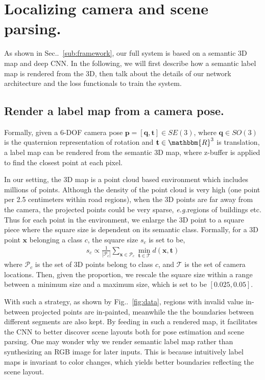 \documentclass[10pt,twocolumn,letterpaper]{article}
\makeatletter
\newcommand{\figref}[1]{Fig\onedot~\ref{#1}}
\newcommand{\secref}[1]{Sec\onedot~\ref{#1}}
\newcommand{\ve}[1]{{\mathbf #1}} %
\newcommand{\hua}[1]{{\mathcal #1}}
\DeclareRobustCommand\onedot{\futurelet\@let@token\@onedot}
\def\onedot{\ifx\@let@token.\else.\null\fi\xspace}
\def\eg{\emph{e.g.}}
\makeatother
\begin{document}
\section{Localizing camera and scene parsing.}
\label{sec:localize_and_parsing}
As shown in \secref{sub:framework}, our full system is based on a semantic 3D map and deep CNN. In the following, we will first describe how a semantic label map is rendered from the 3D, then talk about the details of our network architecture and the loss functionals to train the system.

\subsection{Render a label map from a camera pose.} 
\label{sub:render}
Formally, given a 6-DOF camera pose $\ve{p} = [\ve{q}, \ve{t}] \in SE(3)$, where $\ve{q} \in SO(3)$ is the quaternion representation of rotation and $\ve{t} \in \mathbbm{R}^3$ is translation, a label map can be rendered from the semantic 3D map, where z-buffer is applied to find the closest point at each pixel.

In our setting, the 3D map is a point cloud based environment which includes millions of points. Although the density of the point cloud is very high (one point per 2.5 centimeters within road regions), when the 3D points are far away from the camera, the projected points could be very sparse, \eg regions of buildings etc.
Thus for each point in the environment, we enlarge the 3D point to a square piece where the square size is dependent on its semantic class. Formally, for a 3D point $\ve{x}$ belonging a class $c$, the square size $s_c$ is set to be,
\begin{align}
\label{eq:square_size}
s_c \propto \frac{1}{|\hua{P}_c|}\sum_{\ve{x}\in \hua{P}_c} \min_{\ve{t}\in\hua{T}} d(\ve{x}, \ve{t})
\end{align}
where $\hua{P}_c$ is the set of 3D points belong to class $c$, and $\hua{T}$ is the set of camera locations. Then, given the proportion, we rescale the square size within a range between a minimum size and a maximum size, which is set to be $[0.025, 0.05]$.

With such a strategy, as shown by \figref{fig:data}, regions with invalid value in-between projected points are in-painted, meanwhile the the boundaries between different segments are also kept. By feeding in such a rendered map, it facilitates the CNN to better discover scene layouts both for pose estimation and scene parsing.
One may wonder why we render semantic label map rather than synthesizing an RGB image for later inputs. 
This is because intuitively label maps is invariant to color changes, which yields better boundaries reflecting the scene layout. 
\end{document}
